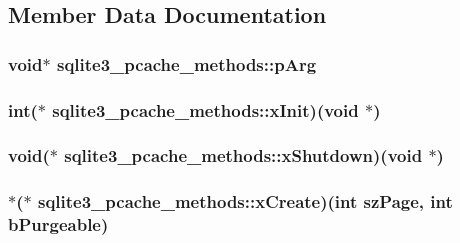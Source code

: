 \subsection{Member Data Documentation}
\hypertarget{structsqlite3__pcache__methods_c71a23fce5a94ac9bc6babdbbaf1b5b4}{
\subsubsection[pArg]{\setlength{\rightskip}{0pt plus 5cm}void$\ast$ {\bf sqlite3\_\-pcache\_\-methods::pArg}}}
\label{structsqlite3__pcache__methods_c71a23fce5a94ac9bc6babdbbaf1b5b4}


\hypertarget{structsqlite3__pcache__methods_b5f54101f6060de1af0c87b2456231ad}{
\subsubsection[xInit]{\setlength{\rightskip}{0pt plus 5cm}int($\ast$ {\bf sqlite3\_\-pcache\_\-methods::xInit})(void $\ast$)}}
\label{structsqlite3__pcache__methods_b5f54101f6060de1af0c87b2456231ad}


\hypertarget{structsqlite3__pcache__methods_a88bb238d288631e7e06f4da232c3dbb}{
\subsubsection[xShutdown]{\setlength{\rightskip}{0pt plus 5cm}void($\ast$ {\bf sqlite3\_\-pcache\_\-methods::xShutdown})(void $\ast$)}}
\label{structsqlite3__pcache__methods_a88bb238d288631e7e06f4da232c3dbb}


\hypertarget{structsqlite3__pcache__methods_5c4d6839290d34cb3121f5210ddfb2ae}{
\subsubsection[xCreate]{$\ast$($\ast$ {\bf sqlite3\_\-pcache\_\-methods::xCreate})(int szPage, int bPurgeable)}}
\label{structsqlite3__pcache__methods_5c4d6839290d34cb3121f5210ddfb2ae}


